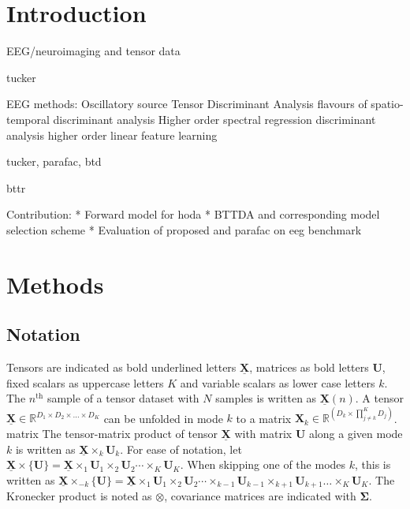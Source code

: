 \documentclass[twocolumn]{article}
\newcommand{\ten}[1]{\underline{\mathbf{#1}}} %
\newcommand{\mat}[1]{\mathbf{#1}} %
\newcommand{\mpr}[2]{\times_{#2} {#1}_{#2}} %
\newcommand{\mmpr}[1]{\times\{#1\}} %
\newcommand{\mmprs}[2]{\times_{-#2}\{#1\}} %
\begin{document}
\section{Introduction}

EEG/neuroimaging and tensor data

tucker

EEG methods:
Oscillatory source Tensor Discriminant Analysis
flavours of spatio-temporal discriminant analysis
Higher order spectral regression discriminant analysis
higher order linear feature learning

tucker, parafac, btd

bttr



Contribution:
* Forward model for hoda
* BTTDA and corresponding model selection scheme
* Evaluation of proposed and parafac on eeg benchmark
\section{Methods}

\subsection{Notation}
Tensors are indicated as bold underlined letters $\ten{X}$, matrices as bold
letters $\mat{U}$, fixed scalars as uppercase letters $K$ and variable
scalars as lower case letters $k$.
The $n^\text{th}$ sample of a tensor dataset with $N$ samples is written as
$\ten{X}(n)$.
A tensor $\ten{X}\in \mathbb{R}^{D_1\times D_2 \times \ldots \times D_K}$ can be unfolded in mode
$k$ to a matrix $\mat{X}_k\in\mathbb{R}^{(D_k\times\prod_{j\neq k}^K D_j)}$.
matrix
The tensor-matrix product of tensor $\ten{X}$ with matrix $\mat{U}$ along a
given mode $k$ is written as $\ten{X}\mpr{\mat{U}}{k}$. For ease of notation, let
$\ten{X}\mmpr{\mat{U}} =
	\ten{X}\mpr{\mat{U}}{1}\mpr{\mat{U}}{2}\cdots\mpr{\mat{U}}{K}$.
When skipping one of the modes $k$, this is
written as $\ten{X}\mmprs{\mat{U}}{k} =
	\ten{X}\mpr{\mat{U}}{1}\mpr{\mat{U}}{2}\cdots\mpr{\mat{U}}{k-1}\mpr{\mat{U}}{k+1}\ldots\mpr{\mat{U}}{K}$.
The Kronecker product is noted as $\otimes$, covariance matrices are indicated  with $\mat{\Sigma}$.
\end{document}
